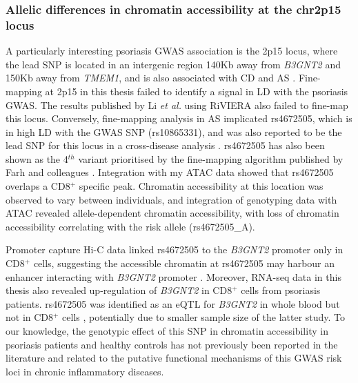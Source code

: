 \subsubsection{Allelic differences in chromatin accessibility at the chr2p15 locus}

A particularly interesting psoriasis GWAS association is the 2p15 locus, where the lead SNP is located in an intergenic region 140Kb away from \textit{B3GNT2} and 150Kb away from \textit{TMEM1}, and is also associated with CD and AS \parencite{Jostins2012,Cortes2013}. Fine-mapping at 2p15 in this thesis failed to identify a signal in LD with the psoriasis GWAS. The results published by Li \textit{et al.} using RiVIERA also failed to fine-map this locus. Conversely, fine-mapping analysis in AS implicated rs4672505, which is in high LD with the GWAS SNP (rs10865331), and was also reported to be the lead SNP for this locus in a cross-disease analysis \parencite{Ellinghaus2016}. rs4672505 has also been shown as the 4$^{th}$ variant prioritised by the fine-mapping algorithm published by Farh and colleagues \parencite{Farh2015}. Integration with my ATAC data showed that rs4672505 overlaps a CD8$^+$ specific peak. Chromatin accessibility at this location was observed to vary between individuals, and integration of genotyping data with ATAC revealed allele-dependent chromatin accessibility, with loss of chromatin accessibility correlating with the risk allele (rs4672505\_A). 

Promoter capture Hi-C data linked rs4672505 to the \textit{B3GNT2} promoter only in CD8$^+$ cells, suggesting the accessible chromatin at rs4672505 may harbour an enhancer interacting with \textit{B3GNT2} promoter \parencite{Javierre2016}. Moreover, RNA-seq data in this thesis also revealed up-regulation of \textit{B3GNT2} in CD8$^+$ cells from psoriasis patients. rs4672505 was identified as an eQTL for \textit{B3GNT2} in whole blood \parencite{Jansen2017} but not in CD8$^+$ cells \parencite{Kasela2017}, potentially due to smaller sample size of the latter study. To our knowledge, the genotypic effect of this SNP in chromatin accessibility in psoriasis patients and healthy controls has not previously been reported in the literature and related to the putative functional mechanisms of this GWAS risk loci in chronic inflammatory diseases.%

